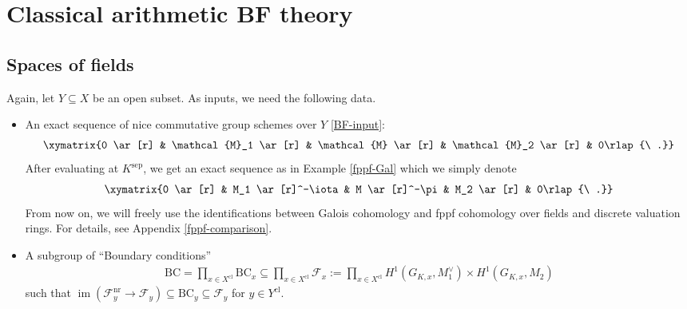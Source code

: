\documentclass[a4paper]{amsart}
\theoremstyle{definition}
\DeclareMathOperator{\im}{im}
\numberwithin{equation}{section}
\begin{document}
\section{Classical arithmetic BF theory}\label{Classical-BF}



\subsection{Spaces of fields}\label{ClassicalBF-SoF} Again, let $Y\subseteq X$ be an open subset. As inputs, we need the following data.
\begin{itemize}
    \item An exact sequence of nice commutative group schemes over $Y$ \eqref{BF-input}:
    \begin{align*}
        \xymatrix{0 \ar[r] & \mathcal{M}_1 \ar[r] & \mathcal{M} \ar[r] & \mathcal{M}_2 \ar[r] & 0\rlap{\ .}}
    \end{align*}
    After evaluating at $K^\mathrm{sep}$, we get an exact sequence as in Example \ref{fppf-Gal} which we simply denote
    \begin{align}\label{numberfeq}
    \xymatrix{0 \ar[r] & M_1 \ar[r]^-\iota & M \ar[r]^-\pi & M_2 \ar[r] & 0\rlap{\ .}}
    \end{align}
     From now on, we will freely use the identifications between Galois cohomology and fppf cohomology over fields and discrete valuation rings. For details, see Appendix \ref{fppf-comparison}.
    \item A subgroup of ``Boundary conditions''
    \begin{align*}
        \mathrm{BC}=\prod_{x\in X^\mathrm{cl}}\mathrm{BC}_x\subseteq\prod_{x\in X^\mathrm{cl}}\mathscr{F}_x:=\prod_{x\in X^\mathrm{cl}}H^1(G_{K,x},M_1^\vee)\times H^1(G_{K,x},M_2)
    \end{align*}
    such that $\im(\mathscr{F}_y^\mathrm{nr}\rightarrow\mathscr{F}_y)\subseteq\mathrm{BC}_y\subseteq\mathscr{F}_y$ for $y\in Y^\mathrm{cl}$.
\end{itemize}
\end{document}
